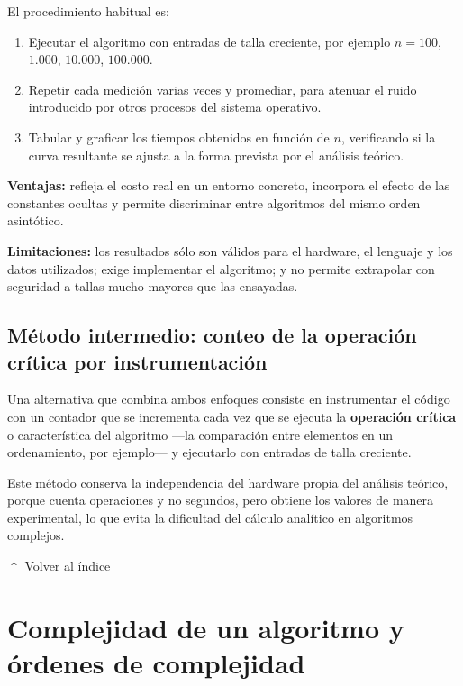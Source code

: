 \documentclass[12pt]{article}
\newcommand{\volverindice}{%
    \vspace{1em}%
    \begin{flushright}%
        \hyperlink{indice}{\small $\uparrow$ Volver al índice}%
    \end{flushright}%
}
\begin{document}
El procedimiento habitual es:

\begin{enumerate}[leftmargin=2em]
    \item Ejecutar el algoritmo con entradas de talla creciente, por ejemplo $n = 100$, $1.000$, $10.000$, $100.000$.
    \item Repetir cada medición varias veces y promediar, para atenuar el ruido introducido por otros procesos del sistema operativo.
    \item Tabular y graficar los tiempos obtenidos en función de $n$, verificando si la curva resultante se ajusta a la forma prevista por el análisis teórico.
\end{enumerate}

\textbf{Ventajas:} refleja el costo real en un entorno concreto, incorpora el efecto de las constantes ocultas y permite discriminar entre algoritmos del mismo orden asintótico.

\textbf{Limitaciones:} los resultados sólo son válidos para el hardware, el lenguaje y los datos utilizados; exige implementar el algoritmo; y no permite extrapolar con seguridad a tallas mucho mayores que las ensayadas.

\subsection{Método intermedio: conteo de la operación crítica por instrumentación}

Una alternativa que combina ambos enfoques consiste en instrumentar el código con un contador que se incrementa cada vez que se ejecuta la \textbf{operación crítica} o característica del algoritmo —la comparación entre elementos en un ordenamiento, por ejemplo— y ejecutarlo con entradas de talla creciente.

Este método conserva la independencia del hardware propia del análisis teórico, porque cuenta operaciones y no segundos, pero obtiene los valores de manera experimental, lo que evita la dificultad del cálculo analítico en algoritmos complejos.

\volverindice
\newpage


\section{Complejidad de un algoritmo y órdenes de complejidad}
\end{document}
